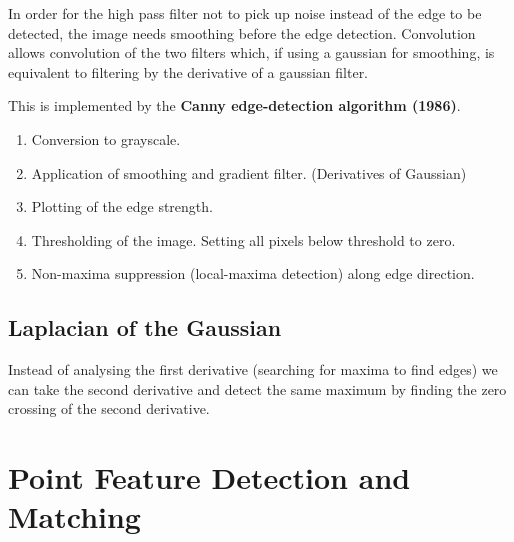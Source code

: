 \documentclass[10pt,a4paper]{scrartcl}
\begin{document}
\begin{multicols*}{2}



In order for the high pass filter not to pick up noise instead of the edge to be detected, the image needs smoothing before the edge detection. Convolution allows convolution of the two filters which, if using a gaussian for smoothing, is equivalent to filtering by the derivative of a gaussian filter.

\vspace{3ex}

This is implemented by the \textbf{Canny edge-detection algorithm (1986)}.

\begin{enumerate}
\item Conversion to grayscale.
\item Application of smoothing and gradient filter. (Derivatives of Gaussian)
\item Plotting of the edge strength.
\item Thresholding of the image. Setting all pixels below threshold to zero.
\item Non-maxima suppression (local-maxima detection) along edge direction.
\end{enumerate}

\subsection{Laplacian of the Gaussian}

Instead of analysing the first derivative (searching for maxima to find edges) we can take the second derivative and detect the same maximum by finding the zero crossing of the second derivative.



\section{Point Feature Detection and Matching}


\end{multicols*}
\end{document}
